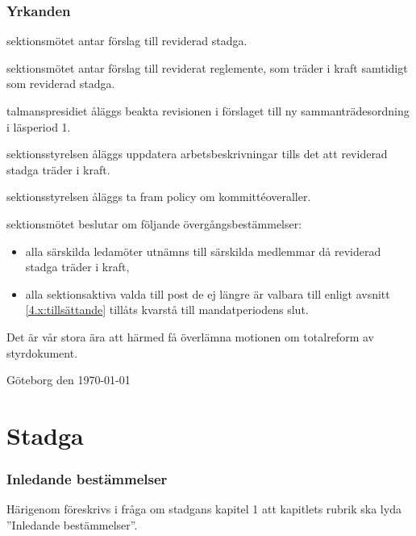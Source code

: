 \documentclass{article}
\begin{document}
\section*{Yrkanden}
\begin{beslut}
	\item sektionsmötet antar förslag till reviderad stadga.
	\item sektionsmötet antar förslag till reviderat reglemente, som träder i kraft samtidigt som reviderad stadga.
	\item talmanspresidiet åläggs beakta revisionen i förslaget till ny sammanträdesordning i läsperiod 1.
	\item sektionsstyrelsen åläggs uppdatera arbetsbeskrivningar tills det att reviderad stadga träder i kraft.
	\item sektionsstyrelsen åläggs ta fram policy om kommittéoveraller.
	\item sektionsmötet beslutar om följande övergångsbestämmelser:
	\begin{itemize}
    \item alla särskilda ledamöter utnämns till särskilda medlemmar då reviderad stadga träder i kraft,
    \item alla sektionsaktiva valda till post de ej längre är valbara till enligt avsnitt \ref{4.x:tillsättande} tillåts kvarstå till mandatperiodens slut.
	\end{itemize}
\end{beslut}

\vspace{10ex}

Det är vår stora ära att härmed få överlämna motionen om totalreform av styrdokument.

Göteborg den \today



\clearpage
\tableofcontents %
\clearpage


\part{Stadga}
\section{Inledande bestämmelser}
Härigenom föreskrivs i fråga om stadgans kapitel 1 att kapitlets rubrik ska lyda ''Inledande bestämmelser''.
\end{document}
